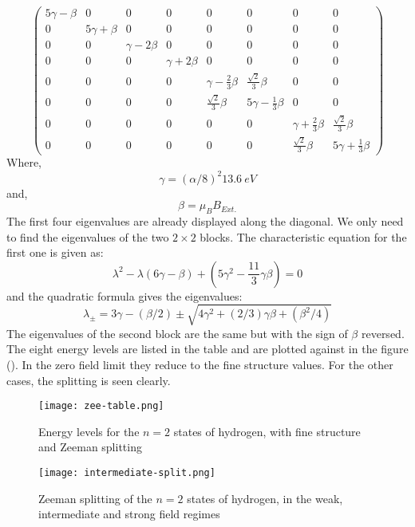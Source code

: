 \begin{equation}
\begin{pmatrix}
5 \gamma - \beta & 0 & 0 & 0 & 0 & 0 & 0 & 0 \\
0 & 5 \gamma + \beta & 0 & 0 & 0 & 0 & 0 & 0\\
0 & 0 & \gamma - 2 \beta & 0 & 0 & 0 & 0 & 0\\
0 & 0 & 0 & \gamma + 2 \beta & 0 & 0 & 0 & 0\\
0 & 0 & 0 & 0 & \gamma - \frac{2}{3} \beta & \frac{\sqrt{2}}{3} \beta & 0 & 0\\
0 & 0 & 0 & 0 & \frac{\sqrt{2}}{3} \beta & 5 \gamma - \frac{1}{3} \beta & 0 & 0\\
0 & 0 & 0 & 0 & 0 & 0 & \gamma + \frac{2}{3} \beta & \frac{\sqrt{2}}{3} \beta\\
0 & 0 & 0 & 0 & 0 & 0 & \frac{\sqrt{2}}{3} \beta & 5 \gamma + \frac{1}{3} \beta
\end{pmatrix}
\end{equation}
Where,
$$\gamma = {(\alpha / 8)}^{2}13.6 \ eV$$
and,
$$\beta = \mu_{B}B_{Ext.}$$
The first four eigenvalues are already displayed along the diagonal. We only need to find the eigenvalues of the two  $2 \times 2$ blocks. The characteristic equation for the first one is given as:
\begin{equation}
\lambda^{2} - \lambda(6\gamma - \beta) + \left(5 \gamma^{2} - \frac{11}{3} \gamma \beta\right) = 0
\end{equation} 
and the quadratic formula gives the eigenvalues:
\begin{equation}
\lambda_{\pm} = 3 \gamma - (\beta /2) \pm \sqrt{4 \gamma^{2} + (2/3) \gamma \beta + (\beta^{2}/4)} 
\end{equation}
The eigenvalues of the second block are the same but with the sign of $\beta$ reversed. The eight energy levels are listed in the table and are plotted against in the figure (). In the zero field limit they reduce to the fine structure values. For the other cases, the splitting is seen clearly.
\begin{figure}[h]
	\centering
	\texttt{[image: zee-table.png]}
	\caption{Energy levels for the $n=2$ states of hydrogen, with fine structure and Zeeman splitting}
\end{figure}
\begin{figure}[h]
	\centering
	\texttt{[image: intermediate-split.png]}
	\caption{Zeeman splitting of the $n = 2$ states of hydrogen, in the weak, intermediate and strong field regimes}
\end{figure}
